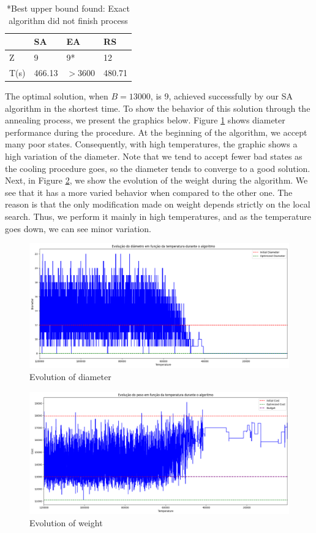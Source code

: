 \documentclass[12pt]{article}
\begin{document}
\begin{table}[H]
\centering
    \begin{tabular}{@{}llll@{}}
    \toprule
         & SA & EA & RS \\ \midrule
    Z    &  9  &  9*  &   12 \\
    T(s) &  466.13  &  $>$3600  &    480.71\\ \bottomrule
    \end{tabular}
    \caption{*Best upper bound found: Exact algorithm did not finish process}
\end{table}

  The optimal solution, when $B=13000$, is 9, achieved successfully by our SA algorithm in the shortest time. To show the behavior of this solution through the annealing process, we present the graphics below. Figure \ref{fig:diameter} shows diameter performance during the procedure. At the beginning of the algorithm, we accept many poor states. Consequently, with high temperatures, the graphic shows a high variation of the diameter. Note that we tend to accept fewer bad states as the cooling procedure goes, so the diameter tends to converge to a good solution. Next, in Figure \ref{fig:weight}, we show the evolution of the weight during the algorithm. We see that it has a more varied behavior when compared to the other one. The reason is that the only modification made on weight depends strictly on the local search. Thus, we perform it mainly in high temperatures, and as the temperature goes down, we can see minor variation. 

    \begin{figure}[H]
        \centering
        \includegraphics[width = 0.8 \linewidth]{grafic_diameter_13000.png}
        \caption{\small Evolution of diameter}
        \label{fig:diameter}
    \end{figure}
    \begin{figure}[H]
        \centering
        \includegraphics[width = 0.8 \linewidth]{grafic_weight_13000.png}
        \caption{\small Evolution of weight}
        \label{fig:weight}
    \end{figure}
        
\end{document}

